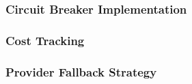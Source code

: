 \documentclass[a4paper,twoside]{sapthesis}
\begin{document}
\subsubsection{Circuit Breaker Implementation}
%
%
%
%
%

\subsubsection{Cost Tracking}
%
%
%
%

\subsubsection{Provider Fallback Strategy}
%
%
%
\end{document}
